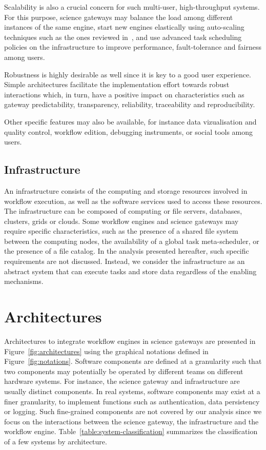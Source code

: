 \documentclass[preprint,3p,twocolumn]{elsarticle}
\newcommand{\correction}[1]{\color{blue}#1\color{black}\xspace}
\begin{document}
Scalability is also a crucial concern for such multi-user,
high-throughput systems. For this purpose, science gateways may
balance the load among different instances of the same engine, start
new engines elastically using auto-scaling techniques such as the ones
reviewed in~\cite{lorido2012auto}, and use advanced task scheduling
policies on the infrastructure to improve performance, fault-tolerance
and fairness among users.

Robustness is highly desirable as well since it is key to a
good user experience. Simple architectures facilitate the
implementation effort towards robust interactions which, in turn, have
a positive impact on characteristics such as gateway predictability,
transparency, reliability, traceability and
reproducibility. 

Other specific features may also be available, for instance
data vizualisation and quality control, workflow edition, debugging
instruments, or social tools among users. 

\subsection{Infrastructure}

An infrastructure consists of the computing and storage
resources involved in workflow execution, as well as the software
services used to access these resources. The infrastructure can be
composed of computing or file servers, databases, clusters, grids or
clouds. Some workflow engines and science gateways may require specific
characteristics, such as the presence of a shared file system between
the computing nodes, the availability of a global task meta-scheduler, or
the presence of a file catalog. In the analysis presented hereafter,
such specific requirements are not discussed. Instead, we consider the
infrastructure as an abstract system that can execute tasks and store
data regardless of the enabling mechanisms.

\section{Architectures}
\label{sec:architectures}


Architectures to integrate workflow engines in science gateways are
presented in Figure~\ref{fig:architectures} using the graphical
notations defined in Figure~\ref{fig:notations}. \correction{Software
  components are defined at a granularity such that two components may
  potentially be operated by different teams on different hardware
  systems. For instance, the science gateway and infrastructure are
  usually distinct components. In real systems, software components
  may exist at a finer granularity, to implement functions such as
  authentication, data persistency or logging. Such fine-grained
  components are not covered by our analysis since we focus on the
  interactions between the science gateway, the infrastructure and the
  workflow engine.}  Table~\ref{table:system-classification}
summarizes the classification of a few systems by architecture.
\end{document}

